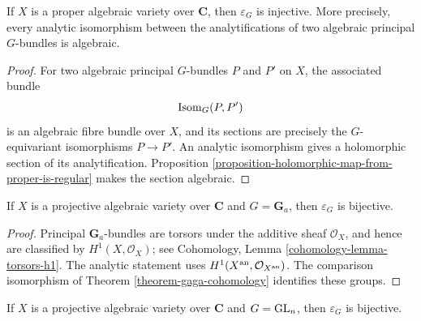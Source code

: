\begin{proposition}
\label{proposition-principal-bundle-analytification-injective}
\begin{reference}
\cite[\S 4, no. 20, Proposition 16]{GAGA}
\end{reference}
If $X$ is a proper algebraic variety over $\mathbf C$, then $\varepsilon_G$
is injective. More
precisely, every analytic isomorphism between the analytifications of two
algebraic principal $G$-bundles is algebraic.
\end{proposition}

\begin{proof}
For two algebraic principal $G$-bundles $P$ and $P'$ on $X$, the associated
bundle
$$
\mathop{\rm Isom}\nolimits_G(P,P')
$$
is an algebraic fibre bundle over $X$, and its sections are precisely the
$G$-equivariant isomorphisms $P\to P'$. An analytic isomorphism gives a
holomorphic section of its analytification. Proposition
\ref{proposition-holomorphic-map-from-proper-is-regular} makes the section
algebraic.
\end{proof}

\begin{proposition}
\label{proposition-additive-principal-bundles-gaga}
\begin{reference}
\cite[\S 4, no. 20, Proposition 17]{GAGA}
\end{reference}
If $X$ is a projective algebraic variety over $\mathbf C$ and
$G=\mathbf G_a$, then
$\varepsilon_G$ is bijective.
\end{proposition}

\begin{proof}
Principal $\mathbf G_a$-bundles are torsors under the additive sheaf
$\mathcal O_X$, and hence are classified by $H^1(X,\mathcal O_X)$; see
Cohomology, Lemma \ref{cohomology-lemma-torsors-h1}. The analytic statement
uses $H^1(X^{\rm an},\mathcal O_{X^{\rm an}})$. The comparison isomorphism
of Theorem \ref{theorem-gaga-cohomology} identifies these groups.
\end{proof}

\begin{proposition}
\label{proposition-general-linear-principal-bundles-gaga}
\begin{reference}
\cite[\S 4, no. 20, Proposition 18]{GAGA}
\end{reference}
If $X$ is a projective algebraic variety over $\mathbf C$ and
$G=\mathop{\rm GL}_n$, then $\varepsilon_G$ is bijective.
\end{proposition}

